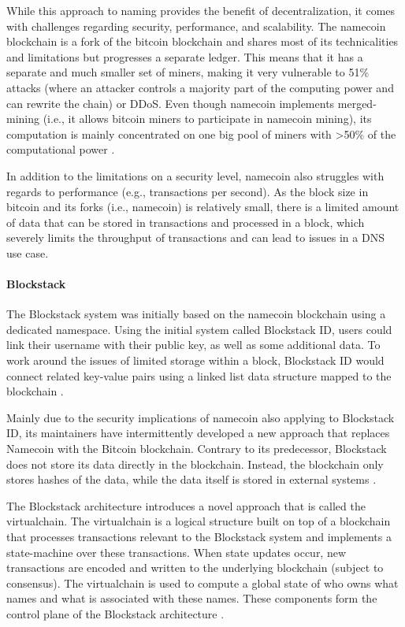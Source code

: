 While this approach to naming provides the benefit of decentralization, it comes with challenges regarding security, performance, and scalability. The namecoin blockchain is a fork of the bitcoin blockchain and shares most of its technicalities and limitations but progresses a separate ledger. This means that it has a separate and much smaller set of miners, making it very vulnerable to 51\% attacks (where an attacker controls a majority part of the computing power and can rewrite the chain) or DDoS. Even though namecoin implements merged-mining (i.e., it allows bitcoin miners to participate in namecoin mining), its computation is mainly concentrated on one big pool of miners with >50\% of the computational power \cite{noauthor_namecoin_nodate, ali_blockstack:_2016}.

In addition to the limitations on a security level, namecoin also struggles with regards to performance (e.g., transactions per second). As the block size in bitcoin and its forks (i.e., namecoin) is relatively small, there is a limited amount of data that can be stored in transactions and processed in a block, which severely limits the throughput of transactions and can lead to issues in a DNS use case.

\paragraph{Blockstack}

The Blockstack system was initially based on the namecoin blockchain using a dedicated namespace. Using the initial system called Blockstack ID, users could link their username with their public key, as well as some additional data. To work around the issues of limited storage within a block, Blockstack ID would connect related key-value pairs using a linked list data structure mapped to the blockchain \cite{ali_blockstack:_2016}.

Mainly due to the security implications of namecoin also applying to Blockstack ID, its maintainers have intermittently developed a new approach that replaces Namecoin with the Bitcoin blockchain. Contrary to its predecessor, Blockstack does not store its data directly in the blockchain. Instead, the blockchain only stores hashes of the data, while the data itself is stored in external systems \cite{ali_blockstack:_2016}.

The Blockstack architecture introduces a novel approach that is called the virtualchain. The virtualchain is a logical structure built on top of a blockchain that processes transactions relevant to the Blockstack system and implements a state-machine over these transactions. When state updates occur, new transactions are encoded and written to the underlying blockchain (subject to consensus). The virtualchain is used to compute a global state of who owns what names and what is associated with these names. These components form the control plane of the Blockstack architecture \cite{ali_blockstack:_2016}.

